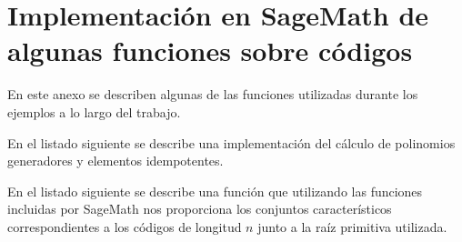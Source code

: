 \chapter{Implementación en SageMath de algunas funciones sobre códigos}
\label{annex:sage-gen-idemp}

En este anexo se describen algunas de las funciones utilizadas durante los ejemplos a lo largo del trabajo.

En el listado siguiente se describe una implementación del cálculo de polinomios generadores y elementos idempotentes.



En el listado siguiente se describe una función que utilizando las funciones incluidas por SageMath nos proporciona los conjuntos característicos correspondientes a los códigos de longitud \(n\) junto a la raíz primitiva utilizada.


